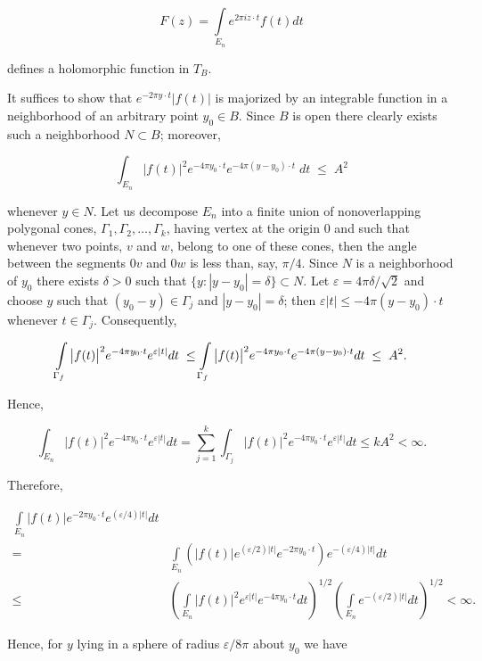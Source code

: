 \begin{equation}\label{eq:c3-2-2}
F(z)=\int\limits_{E_{n}}e^{2\pi i z\cdot t}f(t)d t
\end{equation}

defines a holomorphic function in $T_{B}$.

It suffices to show that $e^{-2\pi y \cdot t}|f(t)|$ is majorized by an integrable function in a neighborhood of an arbitrary point $y_0 \in B$. Since $B$ is open there clearly exists such a neighborhood $N \subset B$; moreover,

\[
\int_{E_{n}}\bigl|f(t)\bigr|^{2}e^{-4\pi y_{0}\cdot t}e^{-4\pi(y-y_{0})\cdot t}\;d t\;\leq\;A^{2}
\]

whenever $y \in N$. Let us decompose $E_n$ into a finite union of nonoverlapping polygonal cones, $\Gamma_1, \Gamma_2, \ldots, \Gamma_k$, having vertex at the origin $0$ and such that whenever two points, $v$ and $w$, belong to one of these cones, then the angle between the segments $0v$ and $0w$ is less than, say, $\pi/4$. Since $N$ is a neighborhood of $y_0$ there exists $\delta > 0$ such that $\{y: |y - y_0| = \delta\} \subset N$. Let $\varepsilon = 4\pi\delta/\sqrt{2}$ and choose $y$ such that $(y_0 - y) \in \Gamma_j$ and $|y - y_0| = \delta$; then $\varepsilon|t| \leq -4\pi(y - y_0) \cdot t$ whenever $t \in \Gamma_j$. Consequently,

\[
\intop_{\Gamma_{f}}\big|f(t)\big|^{2}e^{-4\pi y_{0}\cdot t}e^{\varepsilon|t|}d t\;\leq\intop_{\Gamma_{f}}\big|f(t)\big|^{2}e^{-4\pi y_{0}\cdot t}e^{-4\pi(y-y_{0})\cdot t}d t\;\leq\;A^{2}.
\]

Hence,

\[
\int_{E_{n}}|f(t)|^{2}e^{-4\pi y_{0}\cdot t}e^{\varepsilon|t|}d t=\sum_{j=1}^{k}\int_{\Gamma_{j}}|f(t)|^{2}e^{-4\pi y_{0}\cdot t}e^{\varepsilon|t|}d t\leq k A^{2}<\infty.
\]

Therefore,

\[
\begin{aligned}\int\limits_{E_{n}}|f(t)|e^{-2\pi y_{0}\cdot t}e^{(\varepsilon/4)|t|}dt\\=&\int\limits_{E_{n}}(|f(t)|e^{(\varepsilon/2)|t|}e^{-2\pi y_{0}\cdot t})e^{-(\varepsilon/4)|t|}dt\\\leq&\left(\int\limits_{E_{n}}|f(t)|^{2}e^{\varepsilon|t|}e^{-4\pi y_{0}\cdot t}dt\right)^{1/2}\left(\int\limits_{E_{n}}e^{-(\varepsilon/2)|t|}dt\right)^{1/2}<\infty.\end{aligned}
\]

Hence, for $y$ lying in a sphere of radius $\varepsilon/8\pi$ about $y_0$ we have

